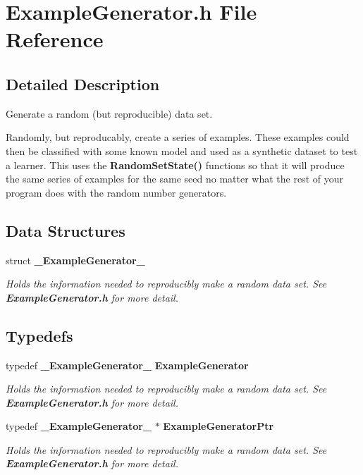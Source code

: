\section{Example\-Generator.h File Reference}
\label{ExampleGenerator_8h}


\subsection{Detailed Description}
Generate a random (but reproducible) data set. 

Randomly, but reproducably, create a series of examples. These examples could then be classified with some known model and used as a synthetic dataset to test a learner. This uses the {\bf Random\-Set\-State()} functions so that it will produce the same series of examples for the same seed no matter what the rest of your program does with the random number generators.

\subsection*{Data Structures}
\begin{CompactItemize}
\item 
struct {\bf \_\-Example\-Generator\_\-}
\begin{CompactList}\small\item\em Holds the information needed to reproducibly make a random data set. See {\bf Example\-Generator.h} for more detail. \item\end{CompactList}\end{CompactItemize}
\subsection*{Typedefs}
\begin{CompactItemize}
\item 
typedef {\bf \_\-Example\-Generator\_\-} {\bf Example\-Generator}
\begin{CompactList}\small\item\em Holds the information needed to reproducibly make a random data set. See {\bf Example\-Generator.h} for more detail. \item\end{CompactList}\item 
typedef {\bf \_\-Example\-Generator\_\-} $\ast$ {\bf Example\-Generator\-Ptr}
\begin{CompactList}\small\item\em Holds the information needed to reproducibly make a random data set. See {\bf Example\-Generator.h} for more detail. \item\end{CompactList}\end{CompactItemize}
